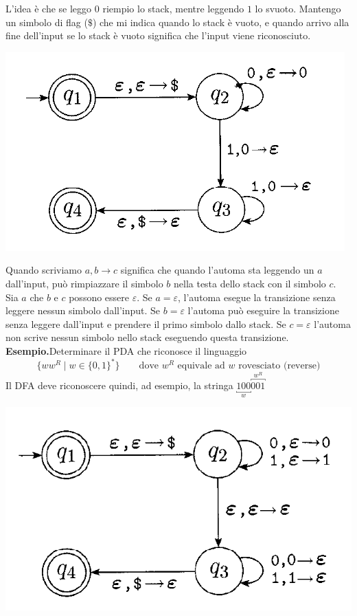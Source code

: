 \documentclass[italian]{article}
\newcommand{\taleche}{\;|\;}
\newcommand{\example}{\noindent\textbf{Esempio.\quad}}
\begin{document}
\noindent
L'idea è che se leggo $0$ riempio lo stack, mentre leggendo $1$ lo svuoto. Mantengo un simbolo di flag ($\$$) che mi indica quando lo stack è vuoto, e quando arrivo alla fine dell'input se lo stack è vuoto significa che l'input viene riconosciuto.
\begin{center}
	\includegraphics[width=0.4\linewidth]{images/pda}
\end{center}
Quando scriviamo $a,b \to c$ significa che quando l'automa sta leggendo un $a$ dall'input, può rimpiazzare il simbolo $b$ nella testa dello stack con il simbolo $c$. Sia $a$ che $b$ e $c$ possono essere $\varepsilon$. Se $a = \varepsilon$, l'automa esegue la transizione senza leggere nessun simbolo dall'input. Se $b=\varepsilon$ l'automa può eseguire la transizione senza leggere dall'input e prendere il primo simbolo dallo stack. Se $c=\varepsilon$ l'automa non scrive nessun simbolo nello stack eseguendo questa transizione. \\

\example Determinare il PDA che riconosce il linguaggio
\[
	\{ ww^R \taleche w \in \{0,1\}^* \}\qquad \text{dove } w^R \text{ equivale ad $w$ rovesciato (reverse)}
\]
Il DFA deve riconoscere quindi, ad esempio, la stringa $\underbracket{100}_{w}\overbracket{001}^{w^R}$
\begin{center}
	\includegraphics[width=0.4\linewidth]{images/pda-1}
\end{center}
\end{document}

